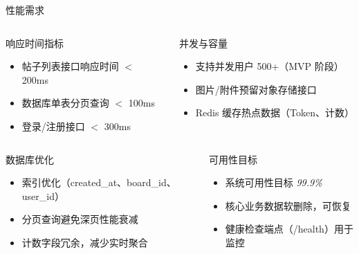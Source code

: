 \documentclass[aspectratio=169,UTF8]{ctexbeamer}
\begin{document}
\begin{frame}{性能需求}
    \begin{columns}
        \begin{block}{响应时间指标}
            \begin{itemize}
                \item 帖子列表接口响应时间 $<$ 200ms
                \item 数据库单表分页查询 $<$ 100ms
                \item 登录/注册接口 $<$ 300ms
            \end{itemize}
        \end{block}
        \begin{block}{并发与容量}
            \begin{itemize}
                \item 支持并发用户 500+（MVP 阶段）
                \item 图片/附件预留对象存储接口
                \item Redis 缓存热点数据（Token、计数）
            \end{itemize}
        \end{block}
    \end{columns}
    \vspace{0.3cm}
    \begin{columns}
        \begin{block}{数据库优化}
            \begin{itemize}
                \item 索引优化（created\_at、board\_id、user\_id）
                \item 分页查询避免深页性能衰减
                \item 计数字段冗余，减少实时聚合
            \end{itemize}
        \end{block}
        \begin{block}{可用性目标}
            \begin{itemize}
                \item 系统可用性目标 \textit{99.9\%}
                \item 核心业务数据软删除，可恢复
                \item 健康检查端点（/health）用于监控
            \end{itemize}
        \end{block}
    \end{columns}
\end{frame}
\end{document}
